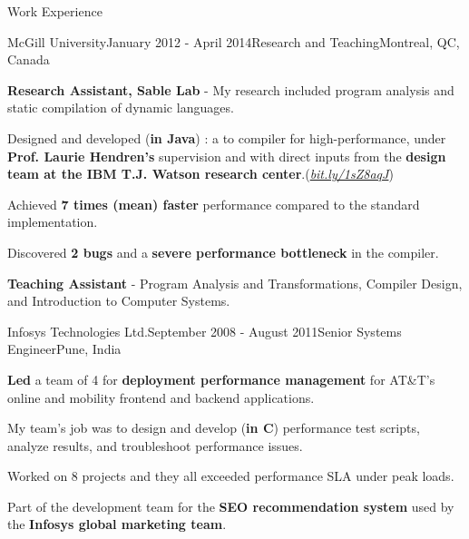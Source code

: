 \documentclass{resume} %
\begin{document}
\begin{rSection}{Work Experience}

\begin{rSubsection}{McGill University}{January 2012 - April 2014}{Research and
Teaching}{Montreal, QC, Canada} 
\item \textbf{Research Assistant, Sable Lab} - My research included program
analysis and static compilation of dynamic languages.

\begin{lsubSubsection}
  \item Designed and developed (\textbf{in Java}) \mixtenx: a {\matlab to
\xten compiler for high-performance}, under \textbf{Prof.
Laurie Hendren's} supervision and with direct inputs from the \textbf{\xten
design team at the IBM T.J. Watson research
center}.(\href{http://bit.ly/1sZ8aqJ}{\em{bit.ly/1sZ8aqJ}})  
 \item Achieved \textbf{7 times (mean) faster} performance compared to the standard
\matlab implementation.
  \item Discovered \textbf{2 bugs} and a \textbf{severe performance bottleneck}
in the \xten compiler.  
\end{lsubSubsection}
\item \textbf{Teaching Assistant} - Program Analysis and Transformations,
	Compiler Design, and Introduction to Computer Systems.
\end{rSubsection}

\begin{rSubsection}{Infosys Technologies Ltd.}{September 2008 - August
2011}{Senior Systems Engineer}{Pune, India}
\item \textbf{Led} a team of 4 for \textbf{deployment performance management}
for AT\&T's online and mobility frontend and backend applications.
\begin{lsubSubsection}
\item My team's job was to design and develop (\textbf{in C}) performance
test scripts, analyze results, and troubleshoot performance issues.  
\item {Worked on 8 projects} and they all exceeded performance SLA under
peak loads.
\end{lsubSubsection}
\item Part of the development team for the \textbf{SEO recommendation system} used
by the \textbf{Infosys global marketing team}.  
\end{rSubsection}


\end{rSection}
\end{document}
